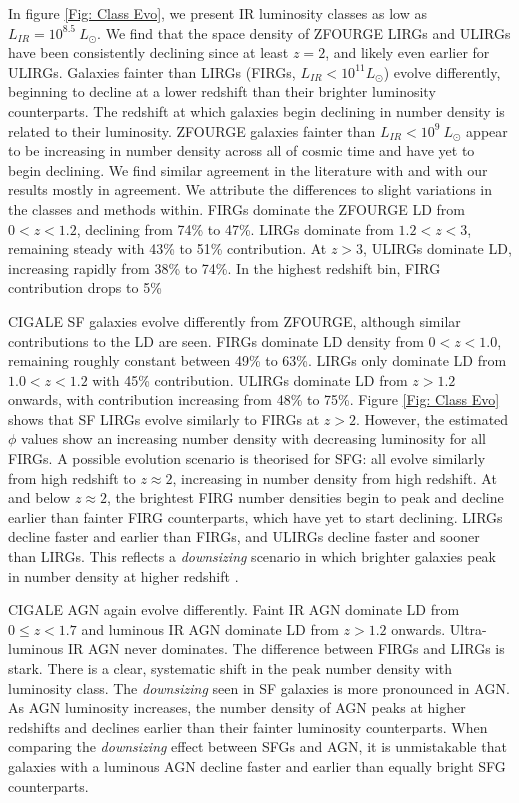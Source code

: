 In figure \ref{Fig: Class Evo}, we present IR luminosity classes as low as $L_{IR}=10^{8.5}\ L_{\odot}$. We find that the space density of ZFOURGE LIRGs and ULIRGs have been consistently declining since at least $z=2$, and likely even earlier for ULIRGs. Galaxies fainter than LIRGs (FIRGs, $L_{IR} < 10^{11} L_{\odot}$) evolve differently, beginning to decline at a lower redshift than their brighter luminosity counterparts. The redshift at which galaxies begin declining in number density is related to their luminosity. ZFOURGE galaxies fainter than $L_{IR} < 10^{9}\ L_{\odot}$ appear to be increasing in number density across all of cosmic time and have yet to begin declining. We find similar agreement in the literature with \cite{rodighiero_mid-_2010} and \cite{gruppioni_herschel_2013} with our results mostly in agreement. We attribute the differences to slight variations in the classes and methods within. FIRGs dominate the ZFOURGE LD from $0<z<1.2$, declining from 74\% to 47\%. LIRGs dominate from $1.2<z<3$, remaining steady with 43\% to 51\% contribution. At $z>3$, ULIRGs dominate LD, increasing rapidly from 38\% to 74\%. In the highest redshift bin, FIRG contribution drops to 5\%

CIGALE SF galaxies evolve differently from ZFOURGE, although similar contributions to the LD are seen. FIRGs dominate LD density from $0<z<1.0$, remaining roughly constant between 49\% to 63\%. LIRGs only dominate LD from $1.0<z<1.2$ with 45\% contribution. ULIRGs dominate LD from $z>1.2$ onwards, with contribution increasing from 48\% to 75\%. Figure \ref{Fig: Class Evo} shows that SF LIRGs evolve similarly to FIRGs at $z>2$. However, the estimated $\phi$ values show an increasing number density with decreasing luminosity for all FIRGs. A possible evolution scenario is theorised for SFG: all evolve similarly from high redshift to $z \approx 2$, increasing in number density from high redshift. At and below $z \approx 2$, the brightest FIRG number densities begin to peak and decline earlier than fainter FIRG counterparts, which have yet to start declining. LIRGs decline faster and earlier than FIRGs, and ULIRGs decline faster and sooner than LIRGs. This reflects a \textit{downsizing} scenario in which brighter galaxies peak in number density at higher redshift \citep{merloni_synthesis_2008, wylezalek_galaxy_2014, fiore_agn_2017}.

CIGALE AGN again evolve differently. Faint IR AGN dominate LD from $0 \leq z < 1.7$ and luminous IR AGN dominate LD from $z>1.2$ onwards. Ultra-luminous IR AGN never dominates. The difference between FIRGs and LIRGs is stark. There is a clear, systematic shift in the peak number density with luminosity class. The \textit{downsizing} seen in SF galaxies is more pronounced in AGN. As AGN luminosity increases, the number density of AGN peaks at higher redshifts and declines earlier than their fainter luminosity counterparts. When comparing the \textit{downsizing} effect between SFGs and AGN, it is unmistakable that galaxies with a luminous AGN decline faster and earlier than equally bright SFG counterparts.

